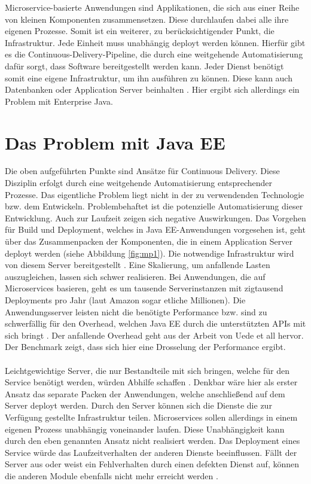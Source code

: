 Microservice-basierte Anwendungen sind Applikationen, die sich aus einer Reihe von kleinen Komponenten zusammensetzen. Diese durchlaufen dabei alle ihre eigenen Prozesse. Somit ist ein weiterer, zu berücksichtigender Punkt, die Infrastruktur. Jede Einheit muss unabhängig deployt werden können. Hierfür gibt es die Continuous-Delivery-Pipeline, die durch eine weitgehende Automatisierung dafür sorgt, dass Software bereitgestellt werden kann. Jeder Dienst benötigt somit eine eigene Infrastruktur, um ihn ausführen zu können. Diese kann auch Datenbanken oder Application Server beinhalten \cite{EberhardWolff.2015}. Hier ergibt sich allerdings ein Problem mit Enterprise Java.

\section{Das Problem mit Java EE}
Die oben aufgeführten Punkte sind Ansätze für Continuous Delivery. Diese Disziplin erfolgt durch eine weitgehende Automatisierung entsprechender Prozesse. Das eigentliche Problem liegt nicht in der zu verwendenden Technologie bzw. dem Entwickeln. Problembehaftet ist die potenzielle Automatisierung dieser Entwicklung. Auch zur Laufzeit zeigen sich negative Auswirkungen. Das Vorgehen für Build und Deployment, welches in Java EE-Anwendungen vorgesehen ist, geht über das Zusammenpacken der Komponenten, die in einem Application Server deployt werden (siehe Abbildung \ref{fig:mp1}). Die notwendige Infrastruktur wird von diesem Server bereitgestellt \cite{LarsRowekamp.2017d}. Eine Skalierung, um anfallende Lasten auszugleichen, lassen sich schwer realisieren. Bei Anwendungen, die auf Microservices basieren, geht es um tausende Serverinstanzen mit zigtausend Deployments pro Jahr (laut Amazon sogar etliche Millionen). Die Anwendungsserver leisten nicht die benötigte Performance bzw. sind zu schwerfällig für den Overhead, welchen Java EE durch die unterstützten APIs mit sich bringt \cite{jaxcenter.2016}. Der anfallende Overhead geht aus der Arbeit von Uede et all \cite{uht.2016} hervor. Der Benchmark zeigt, dass sich hier eine Drosselung der Performance ergibt. \\ \\
Leichtgewichtige Server, die nur Bestandteile mit sich bringen, welche für den Service benötigt werden, würden Abhilfe schaffen \cite{jaxcenter.2016}. Denkbar wäre hier als erster Ansatz das separate Packen der Anwendungen, welche anschließend auf dem Server deployt werden. Durch den Server können sich die Dienste die zur Verfügung gestellte Infrastruktur teilen. Microservices sollen allerdings in einem eigenen Prozess unabhängig voneinander laufen. Diese Unabhängigkeit kann durch den eben genannten Ansatz nicht realisiert werden. Das Deployment eines Service würde das Laufzeitverhalten der anderen Dienste beeinflussen. Fällt der Server aus oder weist ein Fehlverhalten durch einen defekten Dienst auf, können die anderen Module ebenfalls nicht mehr erreicht werden \cite{LarsRowekamp.2017d}.
